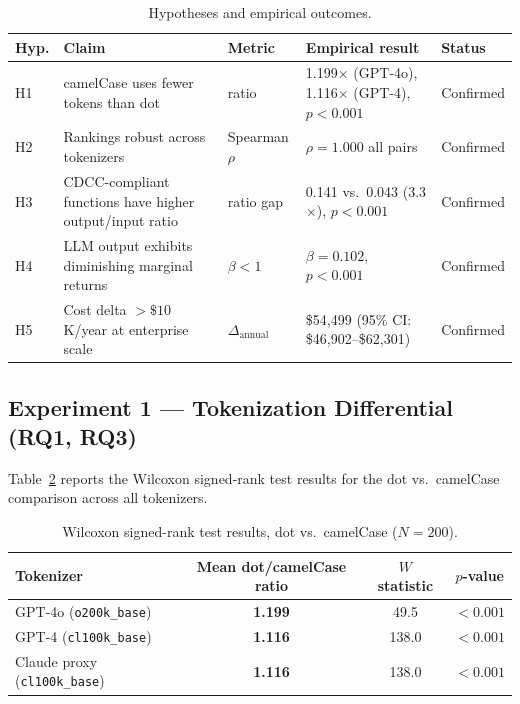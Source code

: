 \documentclass[11pt,a4paper]{article}
\begin{document}
\begin{table}[htbp]
\centering
\caption{Hypotheses and empirical outcomes.}
\label{tab:hypotheses}
\small
\begin{tabularx}{\textwidth}{lXlXl}
\toprule
Hyp. & Claim & Metric & Empirical result & Status \\
\midrule
H1 & camelCase uses fewer tokens than dot & ratio & 1.199$\times$ (GPT-4o), 1.116$\times$ (GPT-4), $p < 0.001$ & Confirmed \\
H2 & Rankings robust across tokenizers & Spearman $\rho$ & $\rho = 1.000$ all pairs & Confirmed \\
H3 & CDCC-compliant functions have higher output/input ratio & ratio gap & 0.141 vs.\ 0.043 (3.3$\times$), $p < 0.001$ & Confirmed \\
H4 & LLM output exhibits diminishing marginal returns & $\beta < 1$ & $\beta = 0.102$, $p < 0.001$ & Confirmed \\
H5 & Cost delta $> \$10$K/year at enterprise scale & $\Delta_{\mathrm{annual}}$ & \$54,499 (95\% CI: \$46,902--\$62,301) & Confirmed \\
\bottomrule
\end{tabularx}
\end{table}

\subsection{Experiment 1 --- Tokenization Differential (RQ1, RQ3)}

Table~\ref{tab:exp1} reports the Wilcoxon signed-rank test results for the
dot vs.\ camelCase comparison across all tokenizers.

\begin{table}[h]
\centering
\caption{Wilcoxon signed-rank test results, dot vs.\ camelCase ($N = 200$).}
\label{tab:exp1}
\begin{tabular}{lccc}
\toprule
Tokenizer & Mean dot/camelCase ratio & $W$ statistic & $p$-value \\
\midrule
GPT-4o (\texttt{o200k\_base})      & \textbf{1.199} & 49.5  & $< 0.001$ \\
GPT-4 (\texttt{cl100k\_base})      & \textbf{1.116} & 138.0 & $< 0.001$ \\
Claude proxy (\texttt{cl100k\_base}) & \textbf{1.116} & 138.0 & $< 0.001$ \\
\bottomrule
\end{tabular}
\end{table}
\end{document}
